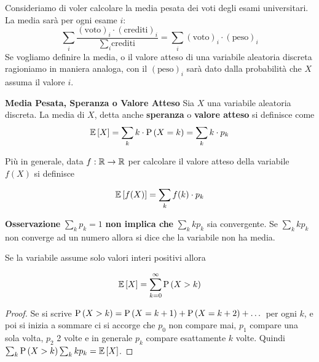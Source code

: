 Consideriamo di voler calcolare la media pesata dei voti degli esami universitari. La media sar\`a  per ogni esame $ i $:
\begin{equation*}
    \sum_{i} \dfrac{(\text{voto})_i \cdot (\text{crediti})_i }{\sum_{i} \text{crediti}} = \sum_{i} (\text{voto})_i \cdot (\text{peso})_i
\end{equation*}
Se vogliamo definire la media, o il valore atteso di una variabile aleatoria discreta ragioniamo in
maniera analoga, con il $(\text{peso})_i$ sar\`a dato dalla probabilit\`a che $X$ assuma il valore $i$.
\begin{defn}
    \textbf{Media Pesata, Speranza o Valore Atteso}
	Sia $ X $ una variabile aleatoria discreta. La media di $ X $, detta anche \textbf{speranza} o \textbf{valore atteso} si definisce come
    \begin{equation*}
    \mathbb{E}\left[X\right] = \sum_{k} k \cdot \text{P}\left(X = k\right) = \sum_{k} k \cdot p_k
    \end{equation*}

    Pi\`u in generale, data  $ f : \mathbb{R} \to \mathbb{R} $ per calcolare il valore atteso della variabile $f(X)$ si definisce

    \begin{equation*}
    \mathbb{E}\left[f(X)\right] = \sum_{k} f(k) \cdot p_k
    \end{equation*}
\end{defn}
\textbf{Osservazione} $\sum_{k} p_k = 1 $ \textbf{non implica che} $ \sum_{k} k p_k $ sia convergente. Se  $ \sum_{k} k p_k $ non converge ad un numero allora si dice che la variabile non ha media.
\begin{prop}
Se la variabile assume solo valori interi positivi allora

\begin{equation}\label{Ex}
\mathbb{E}\left[X\right] = \sum_{k=0}^\infty \text{P}\left(X > k\right)
\end{equation}
\end{prop}
\begin{proof}
    Se si scrive $ \text{P}\left(X > k\right) =  \text{P}\left(X = k+1\right) + \text{P}\left(X = k+2\right) + \dots $ per ogni $k$, e poi si inizia a sommare ci si accorge che $p_0$ non compare mai,
$p_1$ compare una sola volta, $p_2$ 2 volte e in generale $p_k$ compare esattamente $k$ volte.
Quindi  $\sum_{k} \text{P}\left(X > k\right)\sum_{k} k p_k=\mathbb{E}\left[X\right] $.
\end{proof}

